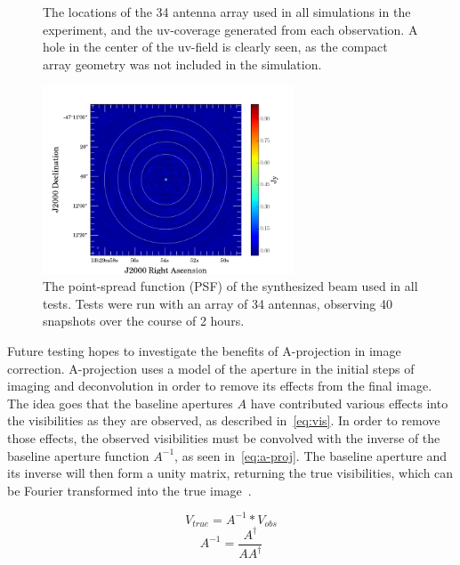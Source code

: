 \documentclass[11pt]{article}
\begin{document}
\begin{figure}
    \centering
    \quad
    \caption{
        The locations of the 34 antenna array used in all simulations in the
        experiment, and the uv-coverage generated from each observation. A
        hole in the center of the uv-field is clearly seen, as the compact 
        array geometry was not included in the simulation.
    }
    \label{fig:params}
\end{figure}

\begin{figure}
    \centering
    \includegraphics[height=2.2in]{images/fits/psf.png}
    \caption{
        The point-spread function (PSF) of the synthesized beam used in all 
        tests.  Tests were run with an array of 34 antennas, observing 40 
        snapshots over the course of 2 hours.
    }
    \label{fig:psf}
\end{figure}

Future testing hopes to investigate the benefits of A-projection in image 
correction. A-projection uses a model of the aperture in the initial steps of 
imaging and deconvolution in order to remove its effects from the final image.  
The idea goes that the baseline apertures $A$ have contributed various effects 
into the visibilities as they are observed, as described in~\eqref{eq:vis}. In 
order to remove those effects, the observed visibilities must be convolved with 
the inverse of the baseline aperture function $A^{-1}$, as seen 
in~\eqref{eq:a-proj}. The baseline aperture and its inverse will then form a 
unity matrix, returning the true visibilities, which can be Fourier transformed 
into the true image~\cite{bhatnager}.

\begin{equation}
    \label{eq:a-proj}
    V_{true} = A^{-1} * V_{obs}
\end{equation}
\begin{equation}
    \label{eq:a-inv}
    A^{-1} = \frac{A^{\dagger}}{AA^{\dagger}}
\end{equation}
\end{document}
